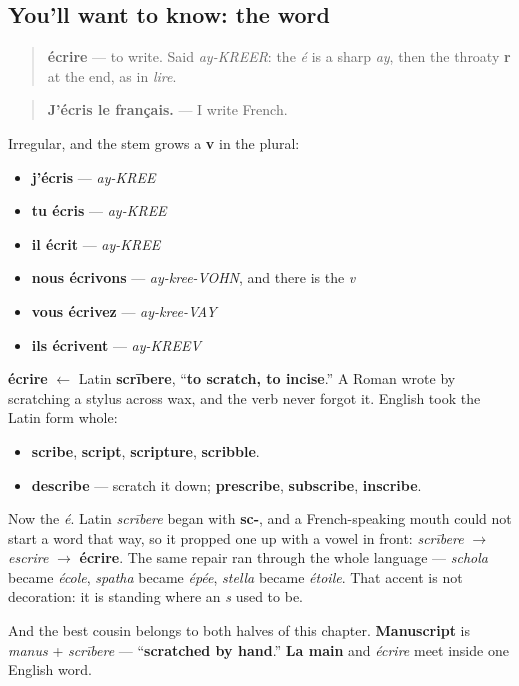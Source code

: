 \subsection*{You'll want to know: the word}
\begin{quote}
\textbf{écrire} — to write. Said \emph{ay-KREER}: the \emph{é} is a sharp \emph{ay}, then the throaty \textbf{r} at the end, as in \emph{lire}.
\end{quote}

\begin{quote}
\textbf{J'écris le français.} — I write French.
\end{quote}

Irregular, and the stem grows a \textbf{v} in the plural:

\begin{itemize}
\raggedright
  \item \textbf{j'écris} — \emph{ay-KREE}
  \item \textbf{tu écris} — \emph{ay-KREE}
  \item \textbf{il écrit} — \emph{ay-KREE}
  \item \textbf{nous écrivons} — \emph{ay-kree-VOHN}, and there is the \emph{v}
  \item \textbf{vous écrivez} — \emph{ay-kree-VAY}
  \item \textbf{ils écrivent} — \emph{ay-KREEV}
\end{itemize}

\begin{cousinweb}
\textbf{écrire} $\leftarrow$ Latin \textbf{scrībere}, \textquotedblleft{}\textbf{to scratch, to incise}.\textquotedblright{} A Roman wrote by scratching a stylus across wax, and the verb never forgot it. English took the Latin form whole:

\begin{itemize}
\raggedright
  \item \textbf{scribe}, \textbf{script}, \textbf{scripture}, \textbf{scribble}.
  \item \textbf{describe} — scratch it down; \textbf{prescribe}, \textbf{subscribe}, \textbf{inscribe}.
\end{itemize}

Now the \emph{é}. Latin \emph{scrībere} began with \textbf{sc-}, and a French-speaking mouth could not start a word that way, so it propped one up with a vowel in front: \emph{scrībere} $\to$ \emph{escrire} $\to$ \textbf{écrire}. The same repair ran through the whole language — \emph{schola} became \emph{école}, \emph{spatha} became \emph{épée}, \emph{stella} became \emph{étoile}. That accent is not decoration: it is standing where an \emph{s} used to be.

And the best cousin belongs to both halves of this chapter. \textbf{Manuscript} is \emph{manus} + \emph{scrībere} — \textquotedblleft{}\textbf{scratched by hand}.\textquotedblright{} \textbf{La main} and \emph{écrire} meet inside one English word.
\end{cousinweb}

